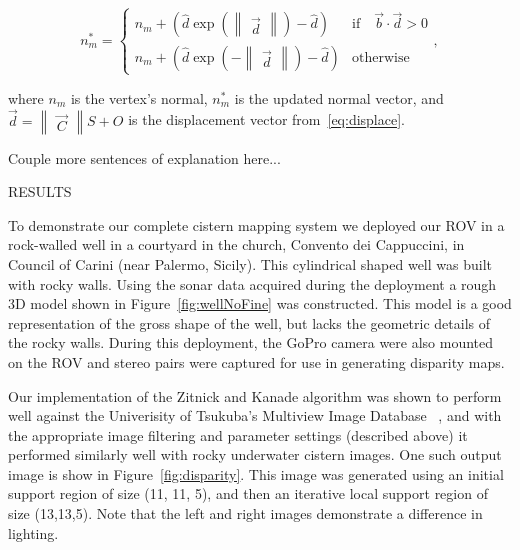 \documentclass[twocolumn]{article}
\makeatletter
\def\section{\@startsection{section}{1}{\z@}{24pt plus 2 pt
minus 2 pt} {12pt plus 2pt minus 2pt}{\large\bf}}
\makeatother
\begin{document}
\begin{equation}
   n_m^* = \left \{ \begin{array}{ll}
      n_m + \left(\hat{d} \exp\left(\begin{Vmatrix}\vec{d}\end{Vmatrix}\right) - \hat{d}\right) & \text{if} \quad \vec{b} \cdot \vec{d} > 0 \\
      n_m + \left(\hat{d} \exp\left(-\begin{Vmatrix}\vec{d}\end{Vmatrix}\right) -   \hat{d}\right) & \text{otherwise}
   \end{array},\right.
\label{eq:lighting}
\end{equation}


where $n_m$ is the vertex's normal, $n_m^*$ is the updated normal vector, and $\vec{d} = \begin{Vmatrix}\vec{C}\end{Vmatrix} S + O$ is the displacement vector from~\eqref{eq:displace}.

Couple more sentences of explanation here...

\section{\uppercase{Results}}
\label{sec:results}

To demonstrate our complete cistern mapping system we deployed our ROV in a rock-walled well in a courtyard in the church, Convento dei Cappuccini, in Council of Carini (near Palermo, Sicily).
This cylindrical shaped well was built with rocky walls.  Using the sonar data acquired during the deployment a rough 3D model shown in Figure~\ref{fig:wellNoFine} was constructed.  This model is a good representation of the gross shape of the well, but lacks the geometric details of the rocky walls.  During this deployment, the GoPro camera were also mounted on the ROV and stereo pairs were captured for use in generating disparity maps.

Our implementation of the Zitnick and Kanade algorithm was shown to perform well against the Univerisity of Tsukuba's Multiview Image Database ~\cite{stereo:zitKan}, and with the appropriate image filtering and parameter settings (described above) it performed similarly well with rocky underwater cistern images.
One such output image is show in Figure~\ref{fig:disparity}.
This image was generated using an initial support region of size (11, 11, 5), and then an iterative local support region of size (13,13,5).
Note that the left and right images demonstrate a difference in lighting.
\end{document}
